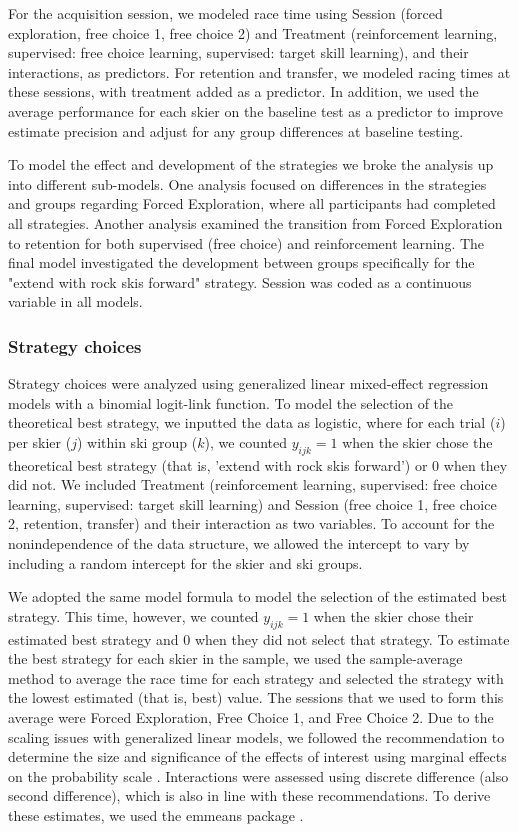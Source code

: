 \documentclass[pdflatex,sn-nature]{sn-jnl}%
\theoremstyle{thmstyleone}%
\theoremstyle{thmstyletwo}%
\theoremstyle{thmstylethree}%
\begin{document}
For the acquisition session, we modeled race time using Session (forced exploration, free choice 1, free choice 2) and Treatment (reinforcement learning, supervised: free choice learning, supervised: target skill learning), and their interactions, as predictors. For retention and transfer, we modeled racing times at these sessions, with treatment added as a predictor. In addition, we used the average performance for each skier on the baseline test as a predictor to improve estimate precision and adjust for any group differences at baseline testing. 

To model the effect and development of the strategies we broke the analysis up into different sub-models. One analysis focused on differences in the strategies and groups regarding Forced Exploration, where all participants had completed all strategies. Another analysis examined the transition from Forced Exploration to retention for both supervised (free choice) and reinforcement learning. The final model investigated the development between groups specifically for the "extend with rock skis forward" strategy. Session was coded as a continuous variable in all models. 

\subsubsection{Strategy choices}
Strategy choices were analyzed using generalized linear mixed-effect regression models with a binomial logit-link function. To model the selection of the theoretical best strategy, we inputted the data as logistic, where for each trial (\(i\)) per skier (\(j\)) within ski group (\(k\)), we counted \(y_{ijk}=1\) when the skier chose the theoretical best strategy (that is, 'extend with rock skis forward') or 0 when they did not. We included Treatment (reinforcement learning, supervised: free choice learning, supervised: target skill learning)  and Session (free choice 1, free choice 2, retention, transfer) and their interaction as two variables. To account for the nonindependence of the data structure, we allowed the intercept to vary by including a random intercept for the skier and ski groups.

We adopted the same model formula to model the selection of the estimated best strategy. This time, however, we counted \(y_{ijk}=1\) when the skier chose their estimated best strategy and 0 when they did not select that strategy. To estimate the best strategy for each skier in the sample, we used the sample-average method \cite{sutton_reinforcement_2018} to average the race time for each strategy and selected the strategy with the lowest estimated (that is, best) value. The sessions that we used to form this average were Forced Exploration, Free Choice 1, and Free Choice 2.  Due to the scaling issues with generalized linear models, we followed the recommendation to determine the size and significance of the effects of interest using marginal effects on the probability scale \cite{mize_best_2019, mccabe_interpreting_2022}. Interactions were assessed using discrete difference (also second difference), which is also in line with these recommendations. To derive these estimates, we used the emmeans package \cite{lenth_emmeans_2023}.
\end{document}
